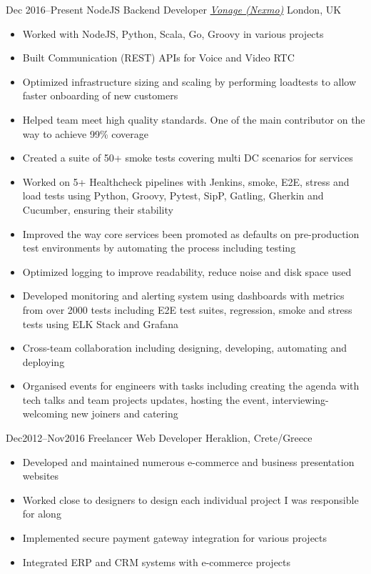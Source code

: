 \begin{entrylist}
\entry
{Dec 2016--Present}
{NodeJS Backend Developer {\normalfont \emph{\href{https://www.vonage.co.uk/}{Vonage (Nexmo)}}}}
{London, UK}
\vspace{-0.6cm}
\begin{itemize}[leftmargin=.6cm]
	\item Worked with NodeJS, Python, Scala, Go, Groovy in various projects
	\item Built Communication (REST) APIs for Voice and Video RTC
	\item Optimized infrastructure sizing and scaling by performing loadtests to allow faster onboarding of new customers
	\item Helped team meet high quality standards. One of the main contributor on the way to achieve 99\% coverage
	\item Created a suite of 50+ smoke tests covering multi DC scenarios for services
	\item Worked on 5+ Healthcheck pipelines with Jenkins, smoke, E2E, stress and load tests using Python, Groovy, Pytest, SipP, Gatling, Gherkin and Cucumber, ensuring their stability
	\item Improved the way core services been promoted as defaults on pre-production test environments by automating the process including testing
	\item Optimized logging to improve readability, reduce noise and disk space used
	\item Developed monitoring and alerting system using dashboards with metrics from over 2000 tests including E2E test suites, regression, smoke and stress tests using ELK Stack and Grafana
	\item Cross-team collaboration including designing, developing, automating and deploying
	\item Organised events for engineers with tasks including creating the agenda with tech talks and team projects updates, hosting the event, interviewing-welcoming new joiners and catering
\end{itemize}

\entry
{Dec2012–Nov2016}
{Freelancer Web Developer}
{Heraklion, Crete/Greece}
\vspace{-0.6cm}
\begin{itemize}[leftmargin=.6cm]
	\item Developed and maintained numerous e-commerce and business presentation websites
	\item Worked close to designers to design each individual project I was responsible for along
	\item Implemented secure payment gateway integration for various projects
	\item Integrated ERP and CRM systems with e-commerce projects 
\end{itemize}

\end{entrylist}

